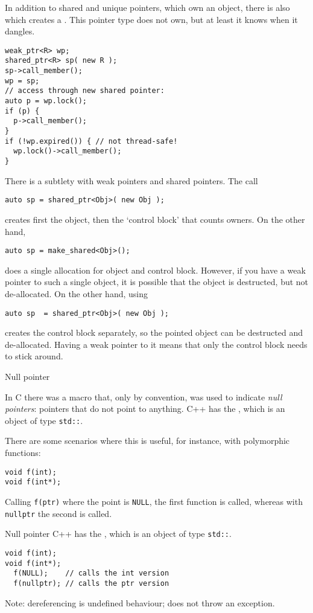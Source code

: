 In addition to shared and unique pointers, which own an object, there
is also  which creates a
. This pointer type does not own, but
at least it knows when it dangles.

\begin{lstlisting}
weak_ptr<R> wp;
shared_ptr<R> sp( new R );
sp->call_member();
wp = sp;
// access through new shared pointer:
auto p = wp.lock();
if (p) {
  p->call_member();
}
if (!wp.expired()) { // not thread-safe!
  wp.lock()->call_member();
}
\end{lstlisting}

There is a subtlety with weak pointers and shared pointers. The call
\begin{lstlisting}
auto sp = shared_ptr<Obj>( new Obj );
\end{lstlisting}
creates first the object, then the `control block' that counts owners.
On the other hand,
\begin{lstlisting}
auto sp = make_shared<Obj>();
\end{lstlisting}
does a single allocation for object and control block. However, if you
have a weak pointer to such a single object, it is possible that the
object is destructed, but not de-allocated. On the other hand, using
\begin{lstlisting}
auto sp  = shared_ptr<Obj>( new Obj );
\end{lstlisting}
creates the control block separately, so the pointed object can be
destructed and de-allocated. Having a weak pointer to it means that only
the control block needs to stick around.

 {Null pointer}

In C there was a macro  that, only by convention, was
used to indicate
\emph{null pointers}:
pointers that do not point to anything.
C++ has the , which is an object of type
\lstinline{std::}.

There are some scenarios where this is useful, for instance, with
polymorphic functions:
\begin{lstlisting}
void f(int);
void f(int*);
\end{lstlisting}
Calling \lstinline{f(ptr)} where the point is \lstinline{NULL}, the first function is
called, whereas with \lstinline{nullptr} the second is called.

\begin{slide}{Null pointer}
  \label{sl:cpp-nullptr}
  C++ has the , which is an object of type
  \lstinline{std::}.

\begin{lstlisting}
void f(int);
void f(int*);
  f(NULL);    // calls the int version
  f(nullptr); // calls the ptr version
\end{lstlisting}
Note: dereferencing is undefined behaviour; does not throw an exception.
\end{slide}

